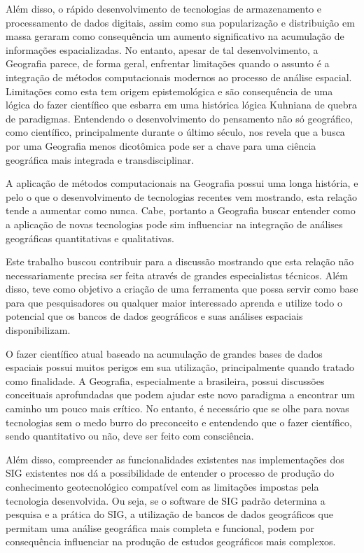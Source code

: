 Além disso, o rápido desenvolvimento de tecnologias de armazenamento e processamento de dados digitais, assim como sua popularização e distribuição em massa geraram como consequência um aumento significativo na acumulação de informações espacializadas. No entanto, apesar de tal desenvolvimento, a Geografia parece, de forma geral, enfrentar limitações quando o assunto é a integração de métodos computacionais modernos ao processo de análise espacial. Limitações como esta tem origem epistemológica e são consequência de uma lógica do fazer científico que esbarra em uma histórica lógica Kuhniana de quebra de paradigmas. Entendendo o desenvolvimento do pensamento não só geográfico, como científico, principalmente durante o último século, nos revela que a busca por uma Geografia menos dicotômica pode ser a chave para uma ciência geográfica mais integrada e transdisciplinar.

A aplicação de métodos computacionais na Geografia possui uma longa história, e pelo o que o desenvolvimento de tecnologias recentes vem mostrando, esta relação tende a aumentar como nunca. Cabe, portanto a Geografia buscar entender como a aplicação de novas tecnologias pode sim influenciar na integração de análises geográficas quantitativas e qualitativas. 

Este trabalho buscou contribuir para a discussão mostrando que esta relação não necessariamente precisa ser feita através de grandes especialistas técnicos. Além disso, teve como objetivo a criação de uma ferramenta que possa servir como base para que pesquisadores ou qualquer maior interessado aprenda e utilize todo o potencial que os bancos de dados geográficos e suas análises espaciais disponibilizam.

O fazer científico atual baseado na acumulação de grandes bases de dados espaciais possui muitos perigos em sua utilização, principalmente quando tratado como finalidade. A Geografia, especialmente a brasileira, possui discussões conceituais aprofundadas que podem ajudar este novo paradigma a encontrar um caminho um pouco mais crítico. No entanto, é necessário que se olhe para novas tecnologias sem o medo burro do preconceito e entendendo que o fazer científico, sendo quantitativo ou não, deve ser feito com consciência. 

Além disso, compreender as funcionalidades existentes nas implementações dos SIG existentes nos dá a possibilidade de entender o processo de produção do conhecimento geotecnológico compatível com as limitações impostas pela tecnologia desenvolvida. Ou seja, se o software de SIG padrão determina a pesquisa e a prática do SIG, a utilização de bancos de dados geográficos que permitam uma análise geográfica mais completa e funcional, podem por consequência influenciar na produção de estudos geográficos mais complexos.

